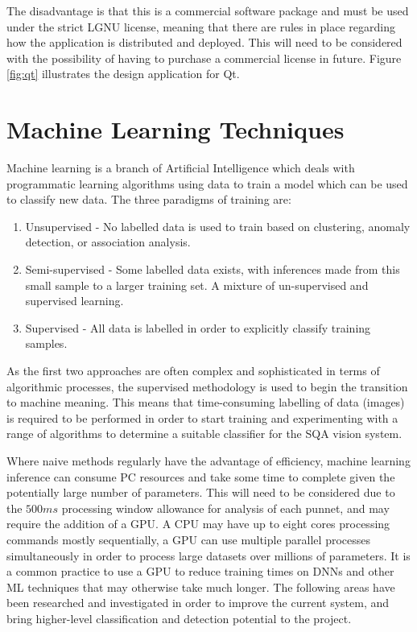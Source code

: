 \documentclass[fleqn,twoside,12pt]{report}
\begin{document}
The disadvantage is that this is a commercial software package and must be used under the strict LGNU license, meaning that there are rules in place regarding how the application is distributed and deployed. This will need to be considered with the possibility of having to purchase a commercial license in future. Figure \ref{fig:qt} illustrates the design application for Qt\textregistered.



\section{Machine Learning Techniques}

Machine learning is a branch of Artificial Intelligence which deals with programmatic learning algorithms using data to train a model which can be used to classify new data. The three paradigms of training are:

\begin{enumerate}
	\item Unsupervised - No labelled data is used to train based on clustering, anomaly detection, or association analysis.
	\item Semi-supervised - Some labelled data exists, with inferences made from this small sample to a larger training set. A mixture of un-supervised and supervised learning.
	\item Supervised - All data is labelled in order to explicitly classify training samples.
\end{enumerate} 

As the first two approaches are often complex and sophisticated in terms of algorithmic processes, the supervised methodology is used to begin the transition to machine meaning. This means that time-consuming labelling of data (images) is required to be performed in order to start training and experimenting with a range of algorithms to determine a suitable classifier for the SQA vision system.

Where naive methods regularly have the advantage of efficiency, machine learning inference can consume PC resources and take some time to complete given the potentially large number of parameters. This will need to be considered due to the $500ms$ processing window allowance for analysis of each punnet, and may require the addition of a GPU. A CPU may have up to eight cores processing commands mostly sequentially, a GPU can use multiple parallel processes simultaneously in order to process large datasets over millions of parameters. It is a common practice to use a GPU to reduce training times on DNNs and other ML techniques that may otherwise take much longer. The following areas have been researched and investigated in order to improve the current system, and bring higher-level classification and detection potential to the project.
\end{document}
